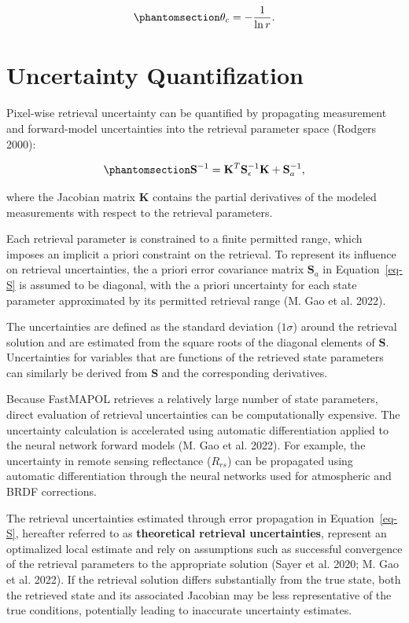 \documentclass[
  11pt,
  letterpaper,
  DIV=11,
  numbers=noendperiod]{scrreprt}
\begin{document}
\begin{equation}\phantomsection\label{eq-thetac2r}{
\theta_c
=
-\frac{1}{\ln r}.
}\end{equation}

\section{Uncertainty Quantifization}\label{uncertainty-quantifization}

Pixel-wise retrieval uncertainty can be quantified by propagating
measurement and forward-model uncertainties into the retrieval parameter
space (Rodgers 2000):

\begin{equation}\phantomsection\label{eq-S}{
\mathbf{S}^{-1}
=
\mathbf{K}^{T}
\mathbf{S}_{\epsilon}^{-1}
\mathbf{K}
+
\mathbf{S}_{a}^{-1},
}\end{equation}

where the Jacobian matrix \(\mathbf{K}\) contains the partial
derivatives of the modeled measurements with respect to the retrieval
parameters.

Each retrieval parameter is constrained to a finite permitted range,
which imposes an implicit a priori constraint on the retrieval. To
represent its influence on retrieval uncertainties, the a priori error
covariance matrix \(\mathbf{S}_a\) in Equation~\ref{eq-S} is assumed to
be diagonal, with the a priori uncertainty for each state parameter
approximated by its permitted retrieval range (M. Gao et al. 2022).

The uncertainties are defined as the standard deviation (\(1\sigma\))
around the retrieval solution and are estimated from the square roots of
the diagonal elements of \(\mathbf{S}\). Uncertainties for variables
that are functions of the retrieved state parameters can similarly be
derived from \(\mathbf{S}\) and the corresponding derivatives.

Because FastMAPOL retrieves a relatively large number of state
parameters, direct evaluation of retrieval uncertainties can be
computationally expensive. The uncertainty calculation is accelerated
using automatic differentiation applied to the neural network forward
models (M. Gao et al. 2022). For example, the uncertainty in remote
sensing reflectance (\(R_{rs}\)) can be propagated using automatic
differentiation through the neural networks used for atmospheric and
BRDF corrections.

The retrieval uncertainties estimated through error propagation in
Equation~\ref{eq-S}, hereafter referred to as \textbf{theoretical
retrieval uncertainties}, represent an optimalized local estimate and
rely on assumptions such as successful convergence of the retrieval
parameters to the appropriate solution (Sayer et al. 2020; M. Gao et al.
2022). If the retrieval solution differs substantially from the true
state, both the retrieved state and its associated Jacobian may be less
representative of the true conditions, potentially leading to inaccurate
uncertainty estimates.
\end{document}
